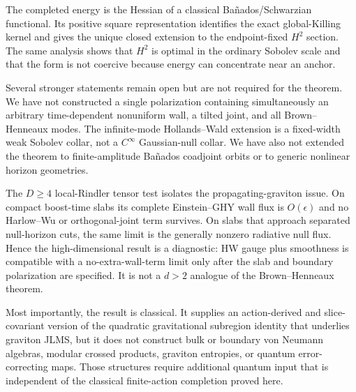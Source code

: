 The completed energy is the Hessian of a classical Bañados/Schwarzian functional. Its positive square representation identifies the exact global-Killing kernel and gives the unique closed extension to the endpoint-fixed $H^2$ section. The same analysis shows that $H^2$ is optimal in the ordinary Sobolev scale and that the form is not coercive because energy can concentrate near an anchor.

Several stronger statements remain open but are not required for the theorem. We have not constructed a single polarization containing simultaneously an arbitrary time-dependent nonuniform wall, a tilted joint, and all Brown--Henneaux modes. The infinite-mode Hollands--Wald extension is a fixed-width weak Sobolev collar, not a $C^\infty$ Gaussian-null collar. We have also not extended the theorem to finite-amplitude Bañados coadjoint orbits or to generic nonlinear horizon geometries.

The $D\geq4$ local-Rindler tensor test isolates the propagating-graviton issue. On compact boost-time slabs its complete Einstein--GHY wall flux is $O(\epsilon)$ and no Harlow--Wu or orthogonal-joint term survives. On slabs that approach separated null-horizon cuts, the same limit is the generally nonzero radiative null flux. Hence the high-dimensional result is a diagnostic: HW gauge plus smoothness is compatible with a no-extra-wall-term limit only after the slab and boundary polarization are specified. It is not a $d>2$ analogue of the Brown--Henneaux theorem.

Most importantly, the result is classical. It supplies an action-derived and slice-covariant version of the quadratic gravitational subregion identity that underlies graviton JLMS, but it does not construct bulk or boundary von Neumann algebras, modular crossed products, graviton entropies, or quantum error-correcting maps. Those structures require additional quantum input that is independent of the classical finite-action completion proved here.
